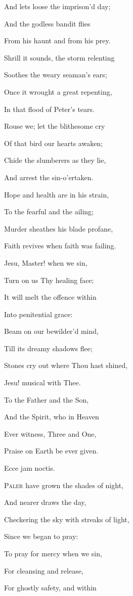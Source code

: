 And lets loose the imprison'd day;

And the godless bandit flies

From his haunt and from his prey.

Shrill it sounds, the storm relenting

Soothes the weary seaman's ears;

Once it wrought a great repenting,

In that flood of Peter's tears.

Rouse we; let the blithesome cry

Of that bird our hearts awaken;

Chide the slumberers as they lie,

And arrest the sin-o'ertaken.

Hope and health are in his strain,

To the fearful and the ailing;

Murder sheathes his blade profane,

Faith revives when faith was failing.

Jesu, Master! when we sin,

Turn on us Thy healing face;

It will melt the offence within

Into penitential grace:

Beam on our bewilder'd mind,

Till its dreamy shadows flee;

Stones cry out where Thou hast shined,

Jesu! musical with Thee. 

To the Father and the Son,

And the Spirit, who in Heaven

Ever witness, Three and One,

Praise on Earth be ever given.


Ecce jam noctis.

P\textsc{aler} have grown the shades of night,

And nearer draws the day,

Checkering the sky with streaks of light,

Since we began to pray:

To pray for mercy when we sin,

For cleansing and release,

For ghostly safety, and within

